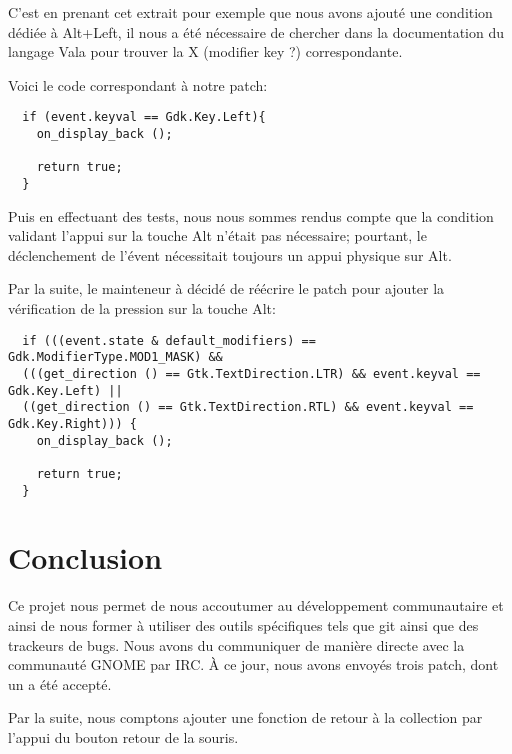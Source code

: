 \documentclass[12pt]{report}
\begin{document}
C'est en prenant cet extrait pour exemple que nous avons ajouté une
condition dédiée à Alt+Left, il nous a été nécessaire de chercher dans
la documentation du langage Vala pour trouver la X (modifier key ?)
correspondante.

Voici le code correspondant à notre patch:

\begin{verbatim}
  if (event.keyval == Gdk.Key.Left){			
    on_display_back ();
    
    return true;
  }
\end{verbatim}

Puis en effectuant des tests, nous nous sommes rendus compte que la
condition validant l'appui sur la touche Alt n'était pas nécessaire;
pourtant, le déclenchement de l'évent nécessitait toujours un appui
physique sur Alt.

Par la suite, le mainteneur à décidé de réécrire le patch pour ajouter
la vérification de la pression sur la touche Alt:

\begin{verbatim}
  if (((event.state & default_modifiers) == Gdk.ModifierType.MOD1_MASK) &&
  (((get_direction () == Gtk.TextDirection.LTR) && event.keyval == Gdk.Key.Left) ||
  ((get_direction () == Gtk.TextDirection.RTL) && event.keyval == Gdk.Key.Right))) {
    on_display_back ();

    return true;
  }
\end{verbatim}

\section{Conclusion}
Ce projet nous permet de nous accoutumer au développement
communautaire et ainsi de nous former à utiliser des outils
spécifiques tels que git ainsi que des trackeurs de bugs.  Nous avons
du communiquer de manière directe avec la communauté GNOME par IRC.  À
ce jour, nous avons envoyés trois patch, dont un a été accepté.

Par la suite, nous comptons ajouter une fonction de retour à la
collection par l'appui du bouton retour de la souris.
\end{document}
